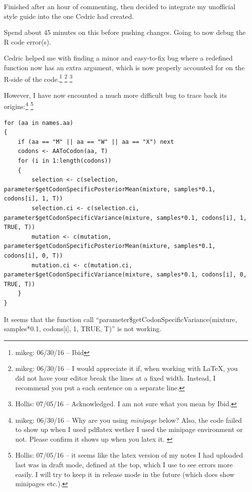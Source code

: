 \documentclass[12pt,hyperref]{labbook}
\newcommand{\sep}{\discretionary{}{}{}} %
\begin{document}
Finished after an hour of commenting, then decided to integrate my unofficial style guide
into the one Cedric had created.

Spend about 45 minutes on this before pushing changes. Going to now debug the R code error(s).


Cedric helped me with finding a minor and easy-to-fix bug where a redefined function
now has an extra argument, which is now properly accounted for on the R-side of the code.\footnote{mikeg: 06/30/16 -- Ibid}
\footnote{mikeg: 06/30/16 -- I would appreciate it if, when working with LaTeX, you did not have your editor break the lines at a fixed width.
Instead, I recommend you put a each sentence on a separate line.
}
\footnote{Hollis: 07/05/16 -- Acknowledged.
I am not sure what you mean by Ibid.}

However, I have now encounted a much more difficult bug to trace back its origins:\footnote{mikeg: 06/30/16 -- Why are you using \emph{minipage} below?
Also, the code failed to show up when I used pdflatex wether I used the minipage environment or not. 
Please confirm it shows up when you latex it.
\label{fn:lstError}
}
\footnote{Hollis: 07/05/16 -- it seems like the latex version of my notes I had uploaded last was in draft mode, defined at the top, which I use to see errors more easily.
I will try to keep it in release mode in the future (which does show minipages etc.).}

\noindent\begin{minipage}{\linewidth}
\begin{lstlisting}
for (aa in names.aa) 
{ 
    if (aa == "M" || aa == "W" || aa == "X") next 
    codons <- AAToCodon(aa, T) 
    for (i in 1:length(codons)) 
    {
        selection <- c(selection, parameter$getCodonSpecificPosteriorMean(mixture, samples*0.1, codons[i], 1, T)) 
        selection.ci <- c(selection.ci, parameter$getCodonSpecificVariance(mixture, samples*0.1, codons[i], 1, TRUE, T)) 
        mutation <- c(mutation, parameter$getCodonSpecificPosteriorMean(mixture, samples*0.1, codons[i], 0, T)) 
        mutation.ci <- c(mutation.ci, parameter$getCodonSpecificVariance(mixture, samples*0.1, codons[i], 0, TRUE, T)) 
    } 
} 
\end{lstlisting}
\end{minipage}


It seems that the function call 
\enquote{parameter\sep \$get\sep Codon\sep Specific\sep Variance\sep (mixture, samples*0.1, codons[i], 1, TRUE, T)} is not working.
\end{document}
